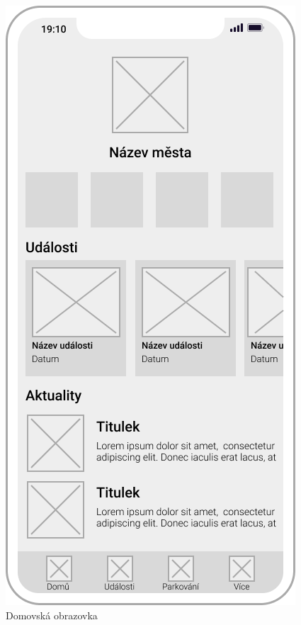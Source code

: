 \begin{figure}[H]
      \includegraphics[width=\linewidth]{home_wireframe.png}
      \caption{Domovská obrazovka}\label{fig:screen1}

\end{figure}
